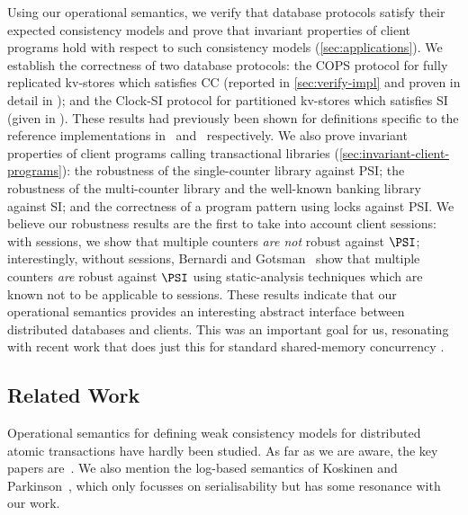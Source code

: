 {Using our operational semantics, we verify 
that database protocols satisfy their expected consistency models and
prove that invariant properties of client programs hold with respect to such
consistency models (\cref{sec:applications}).
We establish the correctness of two database
protocols: the COPS protocol for  fully replicated kv-stores \cite{cops} 
which satisfies CC (reported in \cref{sec:verify-impl}
and proven in  detail in \cite{shale-phd}); 
and the Clock-SI protocol for partitioned kv-stores \cite{clocksi} 
which satisfies SI  (given in \cite{shale-phd}). These results had previously been shown for
definitions specific to the reference implementations in~\cite{cops}
and~\cite{clocksi} respectively.
We also prove invariant properties of client programs calling
transactional libraries (\cref{sec:invariant-client-programs}): the robustness of the single-counter library
against PSI;  the robustness of the multi-counter library and the
well-known banking library \cite{bank-example-wsi} against SI; and the
correctness of a program pattern using locks against PSI. 
We believe our robustness results are the first to take into account client
sessions: with sessions, we show that multiple counters {\em are not} robust against \(\PSI\);
interestingly, without sessions, Bernardi and Gotsman~\citet{giovanni_concur16} show that multiple counters \emph{are}
robust against \(\PSI\) using static-analysis techniques which are
known not to be applicable to sessions.  
These results indicate that  our operational semantics provides an interesting  abstract interface
between distributed databases and clients.
This was an important goal for us, resonating with recent work
that does just this for standard shared-memory concurrency \cite{tada,cap,iris,fcsl}. 



\subsection{Related Work} 
\label{sec:newrelated}

Operational semantics for defining weak consistency models for
distributed atomic transactions have  hardly been
studied. As far as we are aware, the key papers
are~\cite{seebelieve,sureshConcur,alonetogether}. 
We also mention the log-based semantics of Koskinen and Parkinson~\citet{push-pull},
which only focusses on serialisability but has some resonance with our
work. 






}
